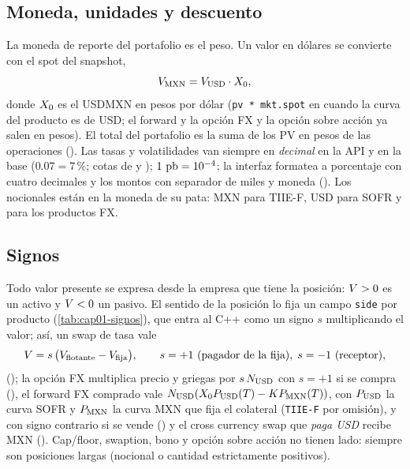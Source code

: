 \begin{sloppypar}
\subsection{Moneda, unidades y descuento}\label{sec:cap01-unidades}

La moneda de reporte del portafolio es el peso. Un valor en dólares se convierte con el spot del snapshot,
\begin{equation}\label{eq:cap01-reporte}
  V_{\textup{MXN}}=V_{\textup{USD}}\cdot X_0 ,
\end{equation}
donde $X_0$ es el USDMXN en pesos por dólar (\texttt{pv * mkt.spot} en
 cuando la curva del producto es de USD; el forward y la opción FX y
la opción sobre acción ya salen en pesos). El total del portafolio es la suma de los PV en pesos de las
operaciones (). Las tasas y volatilidades van siempre en
\emph{decimal} en la API y en la base ($0.07=7\,\%$; cotas de  y
); $1~\textup{pb}=10^{-4}$; la interfaz formatea a porcentaje con cuatro
decimales y los montos con separador de miles y moneda (). Los
nocionales están en la moneda de su pata: MXN para TIIE-F, USD para SOFR y para los productos FX.

\subsection{Signos}\label{sec:cap01-signos}

Todo valor presente se expresa desde la empresa que tiene la posición: $V>0$ es un activo y $V<0$ un
pasivo. El sentido de la posición lo fija un campo \texttt{side} por producto (\cref{tab:cap01-signos}),
que entra al C++ como un signo $s$ multiplicando el valor; así, un swap de tasa vale
\begin{equation}\label{eq:cap01-signo-swap}
  V=s\,\bigl(V_{\text{flotante}}-V_{\text{fija}}\bigr),\qquad s=+1\text{ (pagador de la fija)},\; s=-1\text{ (receptor)},
\end{equation}
(); la opción FX multiplica precio y griegas por
$s\,N_{\textup{USD}}$ con $s=+1$ si se compra (), el forward
FX comprado vale $N_{\textup{USD}}(X_0 P_{\textup{USD}}(T)-K P_{\textup{MXN}}(T))$, con $P_{\textup{USD}}$ la curva SOFR y $P_{\textup{MXN}}$ la curva MXN que fija el colateral (\texttt{TIIE-F} por omisión), y con signo contrario si se vende
() y el cross currency swap que \emph{paga USD} recibe
MXN (). Cap/floor, swaption, bono y opción sobre
acción no tienen lado: siempre son posiciones largas (nocional o cantidad estrictamente positivos).


\end{sloppypar}
